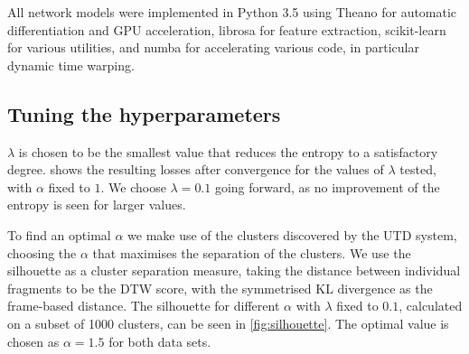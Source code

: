 All network models were implemented in Python 3.5 using Theano \parencite{theano} for automatic differentiation and GPU acceleration, librosa \parencite{librosa} for feature extraction, scikit-learn \parencite{scikit-learn} for various utilities, and numba \parencite{numba} for accelerating various code, in particular dynamic time warping.

\subsection{Tuning the hyperparameters}
$\lambda$ is chosen to be the smallest value that reduces the entropy to a satisfactory degree.
 shows the resulting losses after convergence for the values of $\lambda$ tested, with $\alpha$ fixed to $1$.
We choose $\lambda = 0.1$ going forward, as no improvement of the entropy is seen for larger values.

%

To find an optimal $\alpha$ we make use of the clusters discovered by the UTD system, choosing the $\alpha$ that maximises the separation of the clusters.
We use the silhouette \parencite{rousseeuw1987silhouettes} as a cluster separation measure, taking the distance between individual fragments to be the DTW score, with the symmetrised KL divergence as the frame-based distance.
The silhouette for different $\alpha$ with $\lambda$ fixed to $0.1$, calculated on a subset of 1000 clusters, can be seen in \cref{fig:silhouette}.
The optimal value is chosen as $\alpha = 1.5$ for both data sets.

